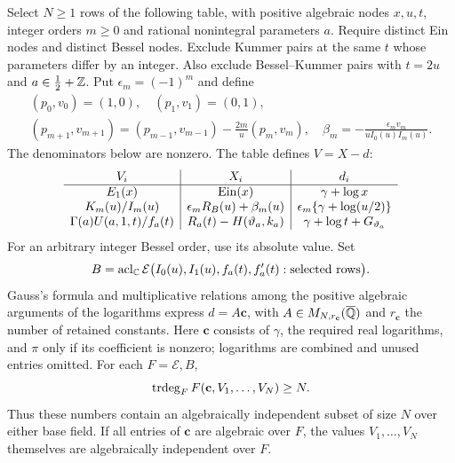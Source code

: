 \begin{theorem}\label{thm:connection}\label{ct2:statement-start}
Select $N\ge1$ rows of the following table, with positive algebraic
nodes $x,u,t$, integer orders $m\ge0$ and rational nonintegral parameters $a$.
Require distinct Ein nodes and distinct Bessel nodes.
Exclude Kummer pairs at the same $t$ whose parameters differ by an integer.
Also exclude Bessel--Kummer pairs with $t=2u$ and $a\in\tfrac12+\mathbb{Z}$.
Put $\epsilon_m=(-1)^m$ and define
\[
\begin{gathered}
 (p_0,v_0)=(1,0),\quad(p_1,v_1)=(0,1),\\
 (p_{m+1},v_{m+1})=(p_{m-1},v_{m-1})-\frac{2m}{u}(p_m,v_m),
 \quad\beta_m=-\frac{\epsilon_mv_m}{uI_0(u)I_m(u)}.
\end{gathered}
\]
The denominators below are nonzero. The table defines $V=X-d$:
\begin{equation}\label{eq:ct2-table}
\begin{array}{c|c|c}
 V_i&X_i&d_i\\ \hline
 E_1(x)&\operatorname{Ein}(x)&\gamma+\log x\\
 K_m(u)/I_m(u)&\epsilon_mR_B(u)+\beta_m(u)&
       \epsilon_m\{\gamma+\log(u/2)\}\\
 \Gamma(a)U(a,1,t)/f_a(t)&R_a(t)-H(\vartheta_a,k_a)&
       \gamma+\log t+G_{\vartheta_a}
\end{array}
\end{equation}
For an arbitrary integer Bessel order, use its absolute value. Set
\[
 B=\operatorname{acl}_{\mathbb{C}}\mathcal E
 \bigl(I_0(u),I_1(u),f_a(t),f'_a(t):\text{selected rows}\bigr).
\]
Gauss's formula and multiplicative relations among the positive algebraic
arguments of the logarithms express $d=A\mathbf c$, with $A\in M_{N,r_{\mathbf c}}({\overline{\mathbb{Q}}})$
and $r_{\mathbf c}$ the number of retained constants.
Here $\mathbf c$ consists of $\gamma$, the required real logarithms, and $\pi$
only if its coefficient is nonzero; logarithms are combined and unused entries omitted.
For each $F=\mathcal E,B$,
\begin{equation}\label{eq:ct2-actual-degree}
 \operatorname{trdeg}_F F(\mathbf c,V_1,\ldots,V_N)\ge N.
\end{equation}
Thus these numbers contain an algebraically independent subset of
size $N$ over either base field. If all entries of $\mathbf c$ are algebraic over
$F$, the values $V_1,\ldots,V_N$ themselves are algebraically independent
 over $F$.
\label{ct2:statement-end}
\end{theorem}
